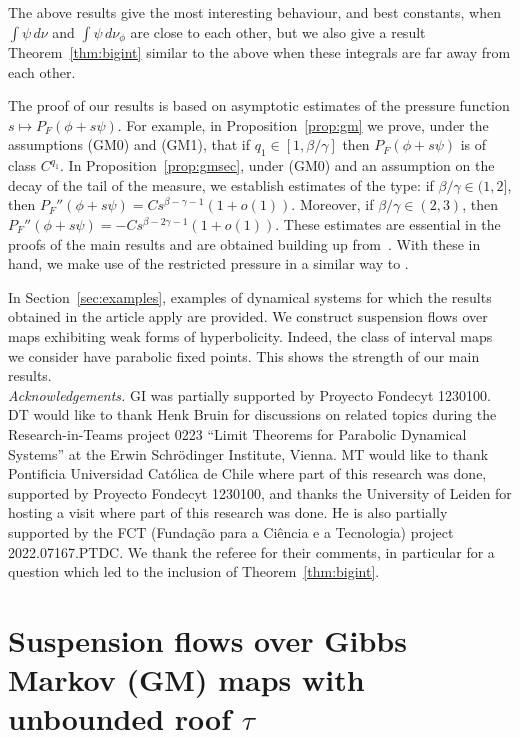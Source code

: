 \documentclass[12pt]{article}
\numberwithin{equation}{section}
\begin{document}
The above results give the most interesting behaviour, and best constants, when $ \int\psi\,d\nu$ and $\int\psi\,d\nu_{\phi}$ are close to each other, but we also give a result Theorem~\ref{thm:bigint} similar to the above when these integrals are far away from each other.

The proof of our results is based on asymptotic estimates of the pressure function $s \mapsto P_F(\phi + s\psi)$. 
For example, in Proposition~\ref{prop:gm} we prove, under the assumptions (GM0) and (GM1), that if $q_1 \in [1, \beta / \gamma]$ then $P_F(\phi + s\psi)$ is of class $C^{q_1}$. 
In Proposition~\ref{prop:gmsec}, under (GM0)  and an assumption on the decay of the tail of the measure, we establish estimates of the type:   if $\beta/\gamma\in (1,2]$, then $ P_F''(\phi + s\psi)=C s^{\beta-\gamma-1}(1+o(1))$. Moreover, if  $\beta/\gamma\in (2, 3)$, then $P_F''(\phi + s\psi)=-C s^{\beta-2\gamma-1}(1+o(1))$. These estimates are essential in the proofs of the main results and are obtained building up from~\cite{BruTerTod19, BruTerTod21, MelTer17}. 
With these in hand, we make use of the restricted pressure in a similar way to \cite{RuhSar22}.

In Section~\ref{sec:examples}, examples of dynamical systems for which the results obtained in the article apply 
are provided. We construct suspension flows over maps exhibiting weak forms of hyperbolicity. 
Indeed, the class of interval maps we consider have parabolic fixed points. This shows the strength of our main results.\\

\textit{Acknowledgements.} 
GI was partially supported by Proyecto Fondecyt 1230100.
DT would like to thank Henk Bruin for discussions on related topics during the
Research-in-Teams project
0223 ``Limit Theorems for Parabolic Dynamical Systems''
at the Erwin Schr\"odinger Institute, Vienna.
MT would like to thank Pontificia Universidad Cat\'olica de Chile where part of this research was done, supported by Proyecto Fondecyt 1230100, and thanks the University of Leiden for hosting a visit where part of this research was done.  He is also partially supported by the FCT (Fundação para a Ciência e a Tecnologia) project 2022.07167.PTDC. We thank the referee for their comments, in particular for a question which led to the inclusion of Theorem~\ref{thm:bigint}.


\section{Suspension flows over Gibbs Markov (GM) maps with unbounded roof $\tau$}
\label{sec:setup}
\end{document}
